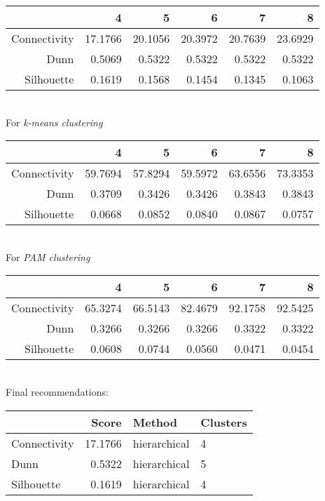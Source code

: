 \documentclass[11p]{article}
\begin{document}
\begin{table}[ht]
\centering
\begin{tabular}{rrrrrr}
  \hline
 & 4 & 5 & 6 & 7 & 8 \\ 
  \hline
Connectivity & 17.1766 & 20.1056 & 20.3972 & 20.7639 & 23.6929 \\ 
  Dunn & 0.5069 & 0.5322 & 0.5322 & 0.5322 & 0.5322 \\ 
  Silhouette & 0.1619 & 0.1568 & 0.1454 & 0.1345 & 0.1063 \\ 
   \hline
\end{tabular}
\end{table}\\
For {\emph{k-means clustering}}\\
\begin{table}[ht]
\centering
\begin{tabular}{rrrrrr}
  \hline
 & 4 & 5 & 6 & 7 & 8 \\ 
  \hline
Connectivity & 59.7694 & 57.8294 & 59.5972 & 63.6556 & 73.3353 \\ 
  Dunn & 0.3709 & 0.3426 & 0.3426 & 0.3843 & 0.3843 \\ 
  Silhouette & 0.0668 & 0.0852 & 0.0840 & 0.0867 & 0.0757 \\ 
   \hline
\end{tabular}
\end{table}\\
For {\emph{PAM clustering}}\\
\begin{table}[ht]
\centering
\begin{tabular}{rrrrrr}
  \hline
 & 4 & 5 & 6 & 7 & 8 \\ 
  \hline
Connectivity & 65.3274 & 66.5143 & 82.4679 & 92.1758 & 92.5425 \\ 
  Dunn & 0.3266 & 0.3266 & 0.3266 & 0.3322 & 0.3322 \\ 
  Silhouette & 0.0608 & 0.0744 & 0.0560 & 0.0471 & 0.0454 \\ 
   \hline
\end{tabular}
\end{table}\\
Final recommendations:
\begin{table}[H]
\centering
\begin{tabular}{lrll}
\hline
& Score & Method & Clusters \\
\hline
Connectivity & 17.1766 & hierarchical & 4 \\
Dunn & 0.5322 & hierarchical & 5 \\
Silhouette & 0.1619 & hierarchical & 4 \\
\hline
\end{tabular}
\end{table}


\newpage

%
\end{document}
